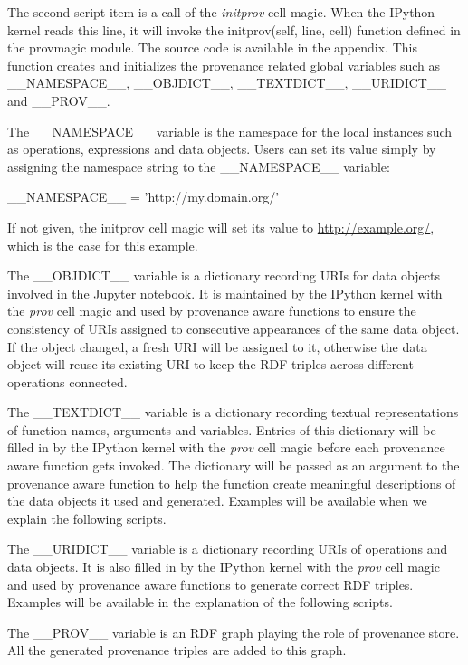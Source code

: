 The second script item is a call of the \emph{initprov} cell magic. When the IPython kernel reads this line, it will invoke the initprov(self, line, cell) function defined in the provmagic module. The source code is available in the appendix. This function creates and initializes the provenance related global variables such as \_\_NAMESPACE\_\_, \_\_OBJDICT\_\_, \_\_TEXTDICT\_\_, \_\_URIDICT\_\_ and \_\_PROV\_\_. 

The \_\_NAMESPACE\_\_ variable is the namespace for the local instances such as operations, expressions and data objects. Users can set its value simply by assigning the namespace string to the \_\_NAMESPACE\_\_ variable:

\_\_NAMESPACE\_\_ = 'http://my.domain.org/'

If not given, the initprov cell magic will set its value to \url{http://example.org/}, which is the case for this example.

The \_\_OBJDICT\_\_ variable is a dictionary recording URIs for data objects involved in the Jupyter notebook. It is maintained by the IPython kernel with the \emph{prov} cell magic and used by provenance aware functions to ensure the consistency of URIs assigned to consecutive appearances of the same data object. If the object changed, a fresh URI will be assigned to it, otherwise the data object will reuse its existing URI to keep the RDF triples across different operations connected.

The \_\_TEXTDICT\_\_ variable is a dictionary recording textual representations of function names, arguments and variables. Entries of this dictionary will be filled in by the IPython kernel with the \emph{prov} cell magic before each provenance aware function gets invoked. The dictionary will be passed as an argument to the provenance aware function to help the function create meaningful descriptions of the data objects it used and generated. Examples will be available when we explain the following scripts.

The \_\_URIDICT\_\_ variable is a dictionary recording URIs of operations and data objects. It is also filled in by the IPython kernel with the \emph{prov} cell magic and used by provenance aware functions to generate correct RDF triples. Examples will be available in the explanation of the following scripts.

The \_\_PROV\_\_ variable is an RDF graph playing the role of provenance store. All the generated provenance triples are added to this graph.

